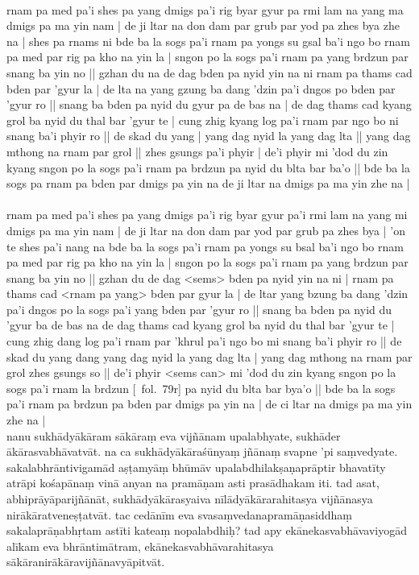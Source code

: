 \documentclass[12pt]{article}
\begin{document}
\textbf{\TVA}\\
rnam pa med pa'i shes pa yang dmigs pa'i rig byar gyur pa rmi lam na yang ma dmigs pa ma yin nam | de ji ltar na don dam par grub par yod pa zhes bya zhe na | shes pa rnams ni bde ba la sogs pa'i rnam pa yongs su gsal ba'i ngo bo rnam pa med par rig pa kho na yin la | sngon po la sogs pa'i rnam pa yang brdzun par snang ba yin no || gzhan du na de dag bden pa nyid yin na ni rnam pa thams cad bden par 'gyur la | de lta na yang gzung ba dang 'dzin pa'i dngos po bden par 'gyur ro || snang ba bden pa nyid du gyur pa de bas na | de dag thams cad kyang grol ba nyid du thal bar 'gyur te | cung zhig kyang log pa'i rnam par ngo bo ni snang ba'i phyir ro || de skad du yang | yang dag nyid la yang dag lta || yang dag mthong na rnam par grol || zhes gsungs pa'i phyir | de'i phyir mi 'dod du zin kyang sngon po la sogs pa'i rnam pa brdzun pa nyid du blta bar ba'o || bde ba la sogs pa rnam pa bden par dmigs pa yin na de ji ltar na dmigs pa ma yin zhe na | \\

\textbf{\TVB}\\
rnam pa med pa'i shes pa yang dmigs pa'i rig byar gyur pa'i rmi lam na yang mi dmigs pa ma yin nam | de ji ltar na don dam par yod par grub pa zhes bya | 'on te shes pa'i nang na bde ba la sogs pa'i rnam pa yongs su bsal ba'i ngo bo rnam pa med par rig pa kho na yin la | sngon po la sogs pa'i rnam pa yang brdzun par snang ba yin no || gzhan du de dag <sems> bden pa nyid yin na ni | rnam pa thams cad <rnam pa yang> bden par gyur la | de ltar yang bzung ba dang 'dzin pa'i dngos po la sogs pa'i yang bden par 'gyur ro || snang ba bden pa nyid du 'gyur ba de bas na de dag thams cad kyang grol ba nyid du thal bar 'gyur te | cung zhig dang log pa'i rnam par 'khrul pa'i ngo bo mi snang ba'i phyir ro || de skad du yang dang yang dag nyid la yang dag lta | yang dag mthong na rnam par grol zhes gsungs so || de'i phyir <sems can> mi 'dod du zin kyang sngon po la sogs pa'i rnam la brdzun [\TVB\ fol.\ 79r] pa nyid du blta bar bya'o || bde ba la sogs pa'i rnam pa brdzun pa bden par dmigs pa yin na | de ci ltar na dmigs pa ma yin zhe na |\\

nanu sukhādyākāram sākāraṃ eva vijñānam\footnoteB{
	sākāraṃ eva vijñānam] \conj (\TIB : rnam pa dang bcas pa'i kho na shes pa); eva vijñānam \MS\ \EDD
} upalabhyate, sukhāder ākārasvabhāvatvāt. na ca sukhādyākāraśūnyaṃ jñānaṃ svapne 'pi saṃvedyate. sakalabhrāntivigamād aṣṭamyāṃ bhūmāv upalabdhilakṣaṇaprāptir bhavatīty atrāpi kośapānaṃ\footnoteB{
	kośapānaṃ] \MS\ (kosapānaṃ); śapathollaṅghanaṃ \EDD\ (\emd)
} vinā anyan na\footnoteB{
	anyan na] \EDD ; anyatra \MS
} pramāṇam asti prasādhakam iti. tad asat,\footnoteB{
	tad asat] \conj\ (\TIB : de ni bden pa ma yin te); tad \MS\ \EDD
} abhiprāyāparijñānāt, sukhādyākārasyaiva nīlādyākārarahitasya vijñānasya nirākāratveneṣṭatvāt. tac cedānīm eva svasaṃvedanapramāṇasiddhaṃ sakalaprāṇabhṛtam\footnoteB{
	°bhṛtam] \emd ; °bhṛtām \MS\ \EDD
} astīti kateaṃ nopalabdhiḥ? tad\footnoteB{
	tad] \conj ; nanu tad \MS\ \EDD
} apy ekānekasvabhāvaviyogād alīkam eva bhrāntimātram, ekānekasvabhāvarahitasya sākāranirākāravijñānavyāpitvāt.\\
\end{document}
